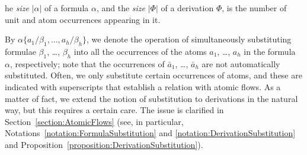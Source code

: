 \newcommand{\size}[1]{{\left\vert #1\right\vert}}\vlupdate\size
The \emph{size} $\size\alpha$ of a formula $\alpha$, and the \emph{size} $\size\Phi$ of a derivation $\Phi$, is the number of unit and atom occurrences appearing in it.

By $\alpha\{a_1/\beta_1,\dots,a_h/\beta_h\}$, we denote the operation of simultaneously substituting formulae $\beta_1$, \dots, $\beta_h$ into all the occurrences of the atoms $a_1$, \dots, $a_h$ in the formula $\alpha$, respectively; note that the occurrences of $\bar a_1$, \dots, $\bar a_h$ are not automatically substituted. Often, we only substitute certain occurrences of atoms, and these are indicated with superscripts that establish a relation with atomic flows. As a matter of fact, we extend the notion of substitution to derivations in the natural way, but this requires a certain care. The issue is clarified in Section~\ref{section:AtomicFlows} (see, in particular, Notations~\ref{notation:FormulaSubstitution} and \ref{notation:DerivationSubstitution} and Proposition~\vref{proposition:DerivationSubstitution}).

